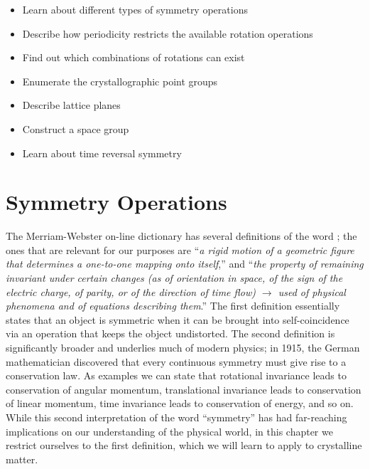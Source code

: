 \begin{learningobjectives}
{\begin{itemize}
    \item[{\color{OCBurntOrange}\ref{\chabbr:sec:symops}:}] Learn about different types of symmetry operations
    \item[{\color{OCBurntOrange}\ref{\chabbr:sec:restrictions}:}] Describe how periodicity restricts the available rotation operations
    \item[{\color{OCBurntOrange}\ref{\chabbr:sec:allowedrots}:}] Find out which combinations of rotations can exist    
    \item[{\color{OCBurntOrange}\ref{\chabbr:sec:pointgroups}:}] Enumerate the crystallographic point groups
    \item[{\color{OCBurntOrange}\ref{\chabbr:sec:planes}:}] Describe lattice planes
    \item[{\color{OCBurntOrange}\ref{\chabbr:sec:spacegroups}:}] Construct a space group
    \item[{\color{OCBurntOrange}\ref{\chabbr:sec:magsym}:}] Learn about time reversal symmetry 
\end{itemize}}
\end{learningobjectives}


\section{Symmetry Operations}\label{\chabbr:sec:symops}
The Merriam-Webster on-line dictionary has several definitions of the word ; the ones that are relevant for our purposes are ``\textit{a rigid motion of a geometric figure that determines a one-to-one mapping onto itself},'' and ``\textit{the property of remaining invariant under certain changes (as of orientation in space, of the sign of the electric charge, of parity, or of the direction of time flow) $\rightarrow$ used of physical phenomena and of equations describing them}.''  The first definition essentially states that an object is symmetric when it can be brought into self-coincidence via an operation that keeps the object undistorted.  The second definition is significantly broader and underlies much of modern physics; in 1915, the German mathematician  discovered that every continuous symmetry must give rise to a conservation law. As examples we can state that rotational invariance leads to conservation of angular momentum, translational invariance leads to conservation of linear momentum, time invariance leads to conservation of energy, and so on.  While this second interpretation of the word ``symmetry'' has had far-reaching implications on our understanding of the physical world, in this chapter we restrict ourselves to the first definition, which we will learn to apply to crystalline matter.\\

